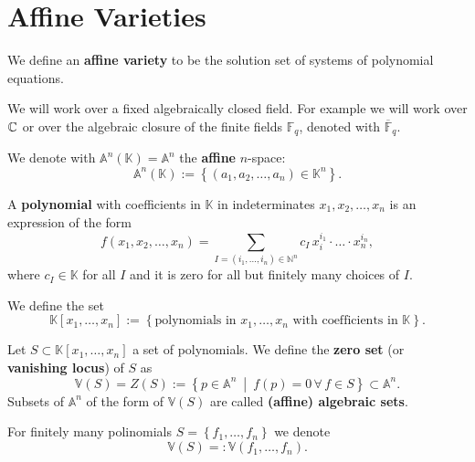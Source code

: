 \section{Affine Varieties}
\begin{defn}
	We define an \textbf{affine variety} to be the solution set of systems of polynomial equations.
\end{defn}
\begin{rem}
	We will work over a fixed algebraically closed field.
	For example we will work over $\mathbb{C}^{}$ or over the algebraic closure of the finite fields $\mathbb{F}_q$, denoted with $\overline{\mathbb{F}}_q$.
\end{rem}

\begin{defn}
	We denote with $\mathbb{A}^n(\mathbb{K}) = \mathbb{A}^n$ the \textbf{affine} $n$-space:
	\begin{equation}
		\mathbb{A}^n(\mathbb{K}) := \left\{ \left(a_1, a_2, \ldots, a_n\right) \in \mathbb{K}^n \right\}
	.\end{equation} 
\end{defn}

\begin{defn}
	A \textbf{polynomial} with coefficients in $\mathbb{K}$ in indeterminates $x_1, x_2, \ldots, x_n$ is an expression of the form
	\begin{equation}
		f \left( x_1, x_2, \ldots, x_n \right) = \sum_{I = \left( i_1, \ldots, i_n \right) \in \mathbb{N}^n}^{} c_I\, x_i^{i_1}\cdot \ldots \cdot x_n^{i_n}
	,\end{equation} 
	where $c_I \in \mathbb{K}$ for all $I$ and it is zero for all but finitely many choices of $I$.
\end{defn}

\begin{defn}
	We define the set
	\begin{equation}
		\mathbb{K}[x_1, \ldots, x_n] := \left\{ \text{polynomials in } x_1, \ldots, x_n \text{ with coefficients in } \mathbb{K} \right\}
	.\end{equation} 
\end{defn}

\begin{defn}
	Let $S \subset \mathbb{K}[x_1, \ldots, x_n]$ a set of polynomials.
	We define the \textbf{zero set} (or \textbf{vanishing locus}) of $S$ as
	\begin{equation}
		\mathbb{V}(S) = Z(S) := \left\{ p \in \mathbb{A}^n \ \middle|\ f(p) = 0 \,\forall\, f \in S \right\} \subset \mathbb{A}^n
	.\end{equation} 
	Subsets of $\mathbb{A}^n$ of the form of $\mathbb{V}(S)$ are called \textbf{(affine) algebraic sets}.

	For finitely many polinomials $S = \left\{ f_1, \ldots, f_n \right\}$ we denote
	 \begin{equation}
		 \mathbb{V}(S) =: \mathbb{V}(f_1, \ldots, f_n)
	.\end{equation} 
\end{defn}

